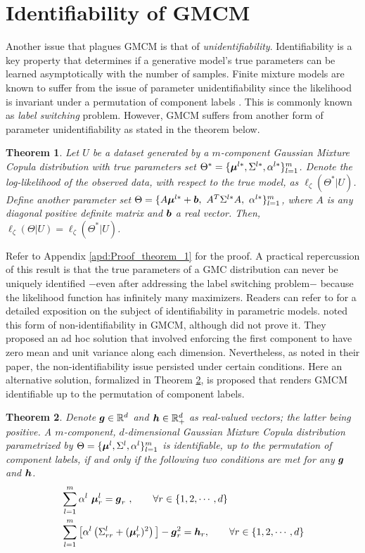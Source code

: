 \documentclass{article}
\theoremstyle{plain}
\newtheorem{theorem}{Theorem}[section]
\theoremstyle{definition}
\theoremstyle{remark}
\begin{document}
\section{Identifiability of GMCM}\label{sec:identifiability_GMCM}
Another issue that plagues GMCM is that of \emph{unidentifiability}. Identifiability is a key property that determines if a generative model's true parameters can be learned asymptotically with the number of samples. Finite mixture models are known to suffer from the issue of parameter unidentifiability since the likelihood is invariant under a permutation of component labels \citep[see][]{Stephens2000}. This is commonly known as \emph{label switching} problem. However, GMCM suffers from another form of parameter unidentifiability as stated in the theorem below.
\begin{theorem}
\label{thm:theorem1}
 Let $U$ be a dataset generated by a $m$-component Gaussian Mixture Copula distribution with true parameters set $\Theta^* = \{\boldsymbol{\mu}^{l*}, \Sigma^{l*}, \alpha^{l*}\}_{l=1}^m$. Denote the log-likelihood of the observed data, with respect to the true model, as $\ell_\zeta(\Theta^*|U)$. Define another parameter set $\Theta= \{A\bs{\mu}^{l*}+\bs{b}, \ A^T\Sigma^{l*}A, \ \alpha^{l*}\}_{l=1}^m$, where $A$ is any diagonal positive definite matrix and $\boldsymbol{b}$ a real vector. Then, $\ell_\zeta(\Theta|U) = \ell_\zeta(\Theta^*|U)$.
\end{theorem}
Refer to Appendix \ref{apd:Proof_theorem_1} for the proof. A practical repercussion of this result is that the true parameters of a GMC distribution can never be uniquely identified $-$even after addressing the label switching problem$-$ because the likelihood function has infinitely many maximizers. Readers can refer to \citet{White1982} for a detailed exposition on the subject of identifiability in parametric models. \citet{Bilgrau2016} noted this form of non-identifiability in GMCM, although did not prove it. They proposed an ad hoc solution that involved enforcing the first component to have zero mean and unit variance along each dimension. Nevertheless, as noted in their paper, the non-identifiability issue persisted under certain conditions. Here an alternative solution, formalized in Theorem \ref{thm:theorem2}, is proposed that renders GMCM identifiable up to the permutation of component labels.
\begin{theorem}
\label{thm:theorem2} 
Denote $\boldsymbol{g}\in \mathbb{R}^d$ and $\boldsymbol{h}\in \mathbb{R}_+^d$ as real-valued vectors; the latter being positive. A $m$-component, $d$-dimensional Gaussian Mixture Copula distribution parametrized by $\Theta = \{\boldsymbol{\mu}^l, \Sigma^l, \alpha^l\}_{l=1}^m$ is identifiable, up to the permutation of component labels, if and only if the following two conditions are met for any $\boldsymbol{g}$ and $\boldsymbol{h}$.
\begin{align}
&\sum_{l=1}^m \alpha^l \ \boldsymbol{\mu}_r^l=\boldsymbol{g}_r \ ,\qquad \forall r \in \{1,2,\cdots,d\} \label{eq:identifiability_constraint_1} \\
&\sum_{l=1}^m \big[ \alpha^l \left(\Sigma_{rr}^l+(\boldsymbol{\mu}_r^l)^2\right)\big] -\boldsymbol{g}_r^2 =\boldsymbol{h}_r ,\qquad \forall r \in \{1,2,\cdots,d\}\label{eq:identifiability_constraint_2}
\end{align}
\end{theorem}
\end{document}
